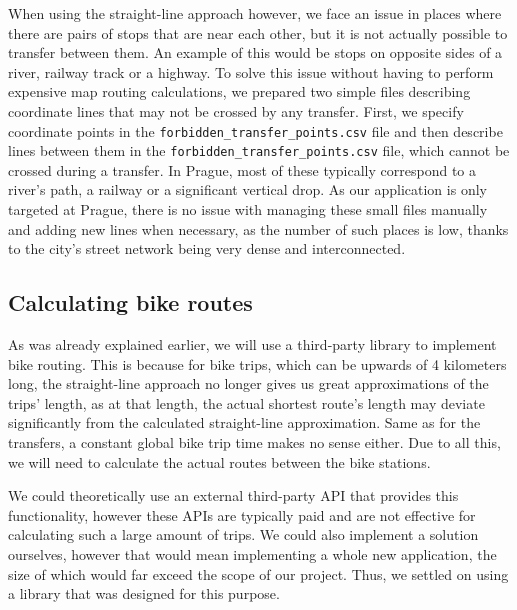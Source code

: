 When using the straight-line approach however, we face an issue in places where there are pairs of stops that are near each other, but it is not actually possible to transfer between them. An example of this would be stops on opposite sides of a river, railway track or a highway. To solve this issue without having to perform expensive map routing calculations, we prepared two simple files describing coordinate lines that may not be crossed by any transfer. First, we specify coordinate points in the \texttt{forbidden\_transfer\_points.csv} file and then describe lines between them in the \texttt{forbidden\_transfer\_points.csv} file, which cannot be crossed during a transfer. In Prague, most of these typically correspond to a river's path, a railway or a significant vertical drop. As our application is only targeted at Prague, there is no issue with managing these small files manually and adding new lines when necessary, as the number of such places is low, thanks to the city's street network being very dense and interconnected.

\subsection{Calculating bike routes}

As was already explained earlier, we will use a third-party library to implement bike routing. This is because for bike trips, which can be upwards of 4 kilometers long, the straight-line approach no longer gives us great approximations of the trips' length, as at that length, the actual shortest route's length may deviate significantly from the calculated straight-line approximation. Same as for the transfers, a constant global bike trip time makes no sense either. Due to all this, we will need to calculate the actual routes between the bike stations. 

We could theoretically use an external third-party API that provides this functionality, however these APIs are typically paid and are not effective for calculating such a large amount of trips. We could also implement a solution ourselves, however that would mean implementing a whole new application, the size of which would far exceed the scope of our project. Thus, we settled on using a library that was designed for this purpose.

